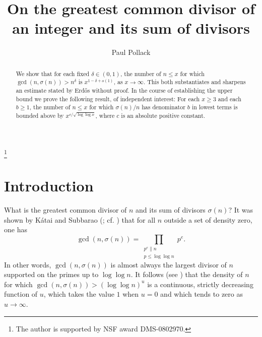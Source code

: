 \documentclass[12pt]{amsart}
\theoremstyle{definition}
\theoremstyle{remark}
\begin{document}
\title[On the greatest common divisor of $n$ and $\sigma(n)$]{On the greatest common divisor of an integer and its sum of divisors}
\author{Paul Pollack}%
\address{Department of Mathematics \\ University of Illinois at Urbana-Champaign \\ 1409 West Green Street\\ Urbana, IL 61801}
\thanks{The author is supported by NSF award DMS-0802970.}
\begin{abstract} We show that for each fixed $\delta \in (0,1)$, the number of $n \leq x$ for which $\gcd(n,\sigma(n)) > n^{\delta}$ is $x^{1-\delta+o(1)}$, as $x\to\infty$. This both substantiates and sharpens an estimate stated by Erd\H{o}s without proof. In the course of establishing the upper bound we prove the following result, of independent interest: For each $x \geq 3$ and each $b\geq 1$, the number of $n\leq x$ for which $\sigma(n)/n$ has denominator $b$ in lowest terms is bounded above by $x^{c/\sqrt{\log\log{x}}}$, where $c$ is an absolute positive constant.
\end{abstract}

\maketitle
\section{Introduction}

What is the greatest common divisor of $n$ and its sum of divisors $\sigma(n)$? It was shown by K\'{a}tai and Subbarao (\cite[Theorem 1]{KS06}; cf.  \cite[Theorem 8]{ELP08}) that for all $n$ outside a set of density zero, one has
\[ \gcd(n,\sigma(n)) = \prod_{\substack{p^e \parallel n \\ p \leq \log\log{n}}} p^e. \]
In other words, $\gcd(n,\sigma(n))$ is almost always the largest divisor of $n$ supported on the primes up to $\log\log{n}$. It follows (see \cite[Corollary 10]{ELP08}) that the density of $n$ for which $\gcd(n,\sigma(n)) > (\log\log{n})^u$ is a continuous, strictly decreasing function of $u$, which takes the value $1$ when $u=0$ and which tends to zero as $u\to\infty$.
\end{document}
